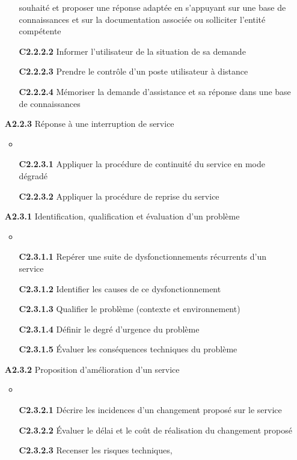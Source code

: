\documentclass[12pt,a4paper,oneside,titlepage,final]{article}
\begin{document}
\begin{enumerate}
\begin{itemize}
    souhaité et proposer une réponse adaptée en s'appuyant sur une
    base de connaissances et sur la documentation associée ou
    solliciter l'entité compétente
    \item [\textbf{C2.2.2.2}] Informer l'utilisateur de la situation
    de sa demande
    \item [\textbf{C2.2.2.3}] Prendre le contrôle d'un poste
    utilisateur à distance
    \item [\textbf{C2.2.2.4}] Mémoriser la demande d'assistance et sa
    réponse dans une base de connaissances
  \end{itemize}
  \item [\textbf{A2.2.3}] Réponse à une interruption de service
  \begin{itemize}
    \item \item [\textbf{C2.2.3.1}] Appliquer la procédure de
    continuité du service en mode dégradé
    \item [\textbf{C2.2.3.2}] Appliquer la procédure de reprise du
    service
  \end{itemize}
  \item [\textbf{A2.3.1}] Identification, qualification et évaluation
  d'un problème
  \begin{itemize}
    \item \item [\textbf{C2.3.1.1}] Repérer une suite de
    dysfonctionnements récurrents d'un service
    \item [\textbf{C2.3.1.2}] Identifier les causes de ce
    dysfonctionnement
    \item [\textbf{C2.3.1.3}] Qualifier le problème (contexte et
    environnement)
    \item [\textbf{C2.3.1.4}] Définir le degré d'urgence du problème
    \item [\textbf{C2.3.1.5}] Évaluer les conséquences techniques du
    problème
  \end{itemize}
  \item [\textbf{A2.3.2}] Proposition d'amélioration d'un service
  \begin{itemize}
    \item \item [\textbf{C2.3.2.1}] Décrire les incidences d'un
    changement proposé sur le service
    \item [\textbf{C2.3.2.2}] Évaluer le délai et le coût de
    réalisation du changement proposé
    \item [\textbf{C2.3.2.3}] Recenser les risques techniques,

\end{itemize}
\end{enumerate}
\end{document}
